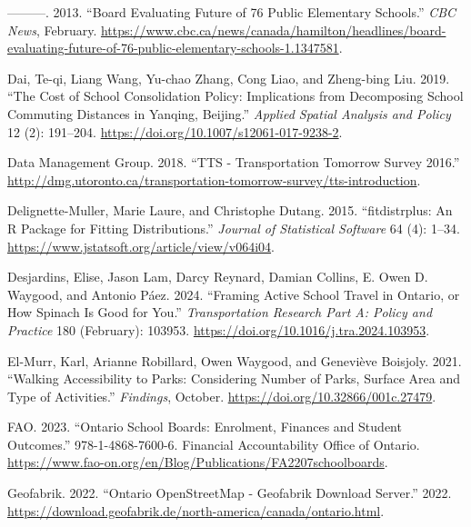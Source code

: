 \documentclass[
default
]{sn-jnl}
\newlength{\cslhangindent}
\newenvironment{CSLReferences}[2] %
 {\begin{list}{}{%
  \setlength{\itemindent}{0pt}
  \setlength{\leftmargin}{0pt}
  \setlength{\parsep}{0pt}
  \ifodd #1
   \setlength{\leftmargin}{\cslhangindent}
   \setlength{\itemindent}{-1\cslhangindent}
  \fi
  \setlength{\itemsep}{#2\baselineskip}}}
 {\end{list}}
\begin{document}
\begin{CSLReferences}{1}{0}
---------. 2013. {``Board Evaluating Future of 76 Public Elementary
Schools.''} \emph{{CBC} News}, February.
\url{https://www.cbc.ca/news/canada/hamilton/headlines/board-evaluating-future-of-76-public-elementary-schools-1.1347581}.

Dai, Te-qi, Liang Wang, Yu-chao Zhang, Cong Liao, and Zheng-bing Liu.
2019. {``The Cost of School Consolidation Policy: Implications from
Decomposing School Commuting Distances in Yanqing, Beijing.''}
\emph{Applied Spatial Analysis and Policy} 12 (2): 191--204.
\url{https://doi.org/10.1007/s12061-017-9238-2}.

Data Management Group. 2018. {``{TTS} - {Transportation} {Tomorrow}
{Survey} 2016.''}
\url{http://dmg.utoronto.ca/transportation-tomorrow-survey/tts-introduction}.

Delignette-Muller, Marie Laure, and Christophe Dutang. 2015.
{``{fitdistrplus}: An {R} Package for Fitting Distributions.''}
\emph{Journal of Statistical Software} 64 (4): 1--34.
\url{https://www.jstatsoft.org/article/view/v064i04}.

Desjardins, Elise, Jason Lam, Darcy Reynard, Damian Collins, E. Owen D.
Waygood, and Antonio Páez. 2024. {``Framing Active School Travel in
{Ontario}, or How Spinach Is Good for You.''} \emph{Transportation
Research Part A: Policy and Practice} 180 (February): 103953.
\url{https://doi.org/10.1016/j.tra.2024.103953}.

El-Murr, Karl, Arianne Robillard, Owen Waygood, and Geneviève Boisjoly.
2021. {``Walking Accessibility to Parks: Considering Number of Parks,
Surface Area and Type of Activities.''} \emph{Findings}, October.
\url{https://doi.org/10.32866/001c.27479}.

FAO. 2023. {``Ontario School Boards: Enrolment, Finances and Student
Outcomes.''} 978-1-4868-7600-6. Financial Accountability Office of
Ontario.
\url{https://www.fao-on.org/en/Blog/Publications/FA2207schoolboards}.

Geofabrik. 2022. {``Ontario {OpenStreetMap} - {Geofabrik Download
Server}.''} 2022.
\url{https://download.geofabrik.de/north-america/canada/ontario.html}.


\end{CSLReferences}
\end{document}
